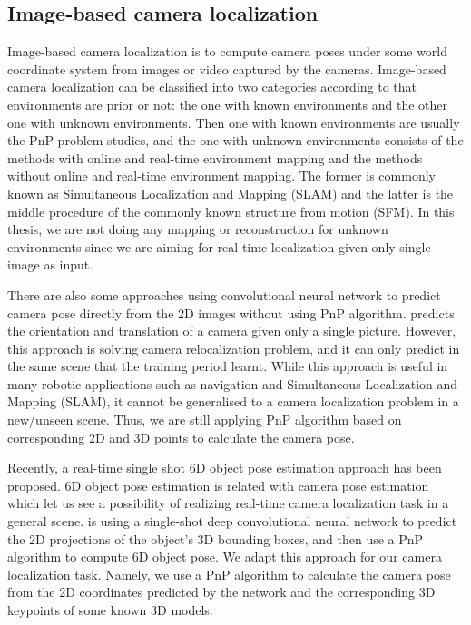 \subsection{Image-based camera localization}

Image-based camera localization \cite{wu2018image} is to compute camera poses under some world coordinate system from images or video captured by the cameras. Image-based camera localization can be classified into two categories according to that environments are prior or not: the one with known environments and the other one with unknown environments. Then one with known environments are usually the PnP problem studies, and the one with unknown environments consists of the methods with online and real-time environment mapping and the methods without online and real-time environment mapping. The former is commonly known as Simultaneous Localization and Mapping (SLAM) and the latter is the middle procedure of the commonly known structure from motion (SFM). In this thesis, we are not doing any mapping or reconstruction for unknown environments since we are aiming for real-time localization given only single image as input.

There are also some approaches using convolutional neural network to predict camera pose directly from the 2D images without using PnP algorithm. \cite{wu2017delving} predicts the orientation and translation of a camera given only a single picture. However, this approach is solving camera relocalization problem, and it can only predict in the same scene that the training period learnt. While this approach is useful in many robotic applications such as navigation and Simultaneous Localization and Mapping (SLAM), it cannot be generalised to a camera localization problem in a new/unseen scene. Thus, we are still applying PnP algorithm based on corresponding 2D and 3D points to calculate the camera pose.

Recently, a real-time single shot 6D object pose estimation approach \cite{tekin2018real} has been proposed. 6D object pose estimation is related with camera pose estimation which let us see a possibility of realizing real-time camera localization task in a general scene. \cite{tekin2018real} is using a single-shot deep convolutional neural network to predict the 2D projections of the object's 3D bounding boxes, and then use a PnP algorithm to compute 6D object pose. We adapt this approach for our camera localization task. Namely, we use a PnP algorithm to calculate the camera pose from the 2D coordinates predicted by the network and the corresponding 3D keypoints of some known 3D models.


